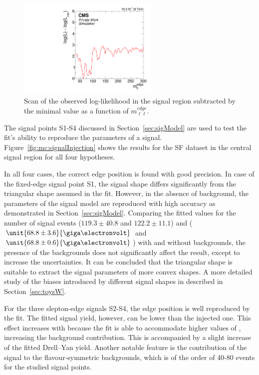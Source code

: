 \begin{figure}[htbp]
\centering
  \includegraphics[width=0.6\textwidth]{plots/results/fit/mcFits/MC.pdf}
\caption{Scan of the observed log-likelihood in the signal region subtracted by the minimal value as a function of $m_{\ell\ell}^{edge}$.}
\label{fig:mc:bgOnlyProfile}
\end{figure}

The signal points S1-S4 discussed in Section~\ref{sec:sigModel} are used to test the fit's ability to reproduce the parameters of a signal. Figure~\ref{fig:mc:signalInjection} shows the results for the SF dataset in the central signal region for all four hypotheses. 

In all four cases, the correct edge position is found with good precision. In case of the fixed-edge signal point S1, the signal shape differs significantly from the triangular shape assumed in the fit. However, in the absence of background, the parameters of the signal model are reproduced with high accuracy as demonstrated in Section~\ref{sec:sigModel}. Comparing the fitted values for the number of signal events ($119.3\pm40.8$ and $122.2\pm11.1$) and \mlledge ($\unit{68.8\pm3.6}{\giga\electronvolt}$ and $\unit{68.8\pm0.6}{\giga\electronvolt}$) with and without backgrounds, the presence of the backgrounds does not significantly affect the result, except to increase the uncertainties. It can be concluded that the triangular shape is suitable to extract the signal parameters of more convex shapes. A more detailed study of the biases introduced by different signal shapes in described in Section~\ref{sec:toysW}. 

For the three slepton-edge signals S2-S4, the edge position is well reproduced by the fit. The fitted signal yield, however, can be lower than the injected one. This effect increases with \mlledge because the fit is able to accommodate higher values of \Rsfof, increasing the background contribution. This is accompanied by a slight increase of the fitted Drell--Yan yield. Another notable feature is the contribution of the signal to the flavour-symmetric backgrounds, which is of the order of 40-80 events for the studied signal points.

